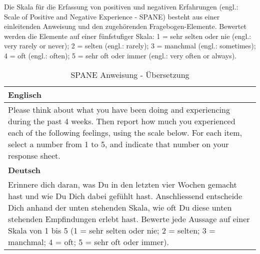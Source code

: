 \begin{RaggedRight}
Die Skala für die Erfassung von positiven und negativen Erfahrungen (engl.: Scale of Positive and Negative Experience - SPANE) \cite{Diener:2010} besteht aus einer einleitenden Anweisung und den zugehörenden Fragebogen-Elemente. Bewertet werden die Elemente auf einer fünfstufiger Skala: 1 = sehr selten oder nie (engl.: very rarely or never); 2 = selten (engl.: rarely); 3 = manchmal (engl.: sometimes); 4 = oft (engl.: often); 5 = sehr oft oder immer (engl.: very often or always). 

\begin{center}
    \begin{longtable}[t]{|p{15 cm}|}
    \caption{SPANE Anweisung - Übersetzung} \\ \hline
        \textbf{Englisch} \\ \hline
        Please think about what you have been doing and experiencing during the past 4 weeks. Then report how much you experienced each of the following feelings, using the scale below. For each item, select a number from 1 to 5, and indicate that number on your response sheet. \\ \hline
        \textbf{Deutsch} \\ \hline 
        Erinnere dich daran, was Du in den letzten vier Wochen gemacht hast und wie Du Dich dabei gefühlt hast. Anschliessend entscheide Dich anhand der unten stehenden Skala, wie oft Du diese unten stehenden Empfindungen erlebt hast. Bewerte jede Aussage auf einer Skala von 1 bis 5 (1 = sehr selten oder nie; 2 = selten; 3 = manchmal; 4 = oft; 5 = sehr oft oder immer). \\ \hline   
    \end{longtable}
	\label{tab:SpaneAnweisung}
\end{center}


\end{RaggedRight}
